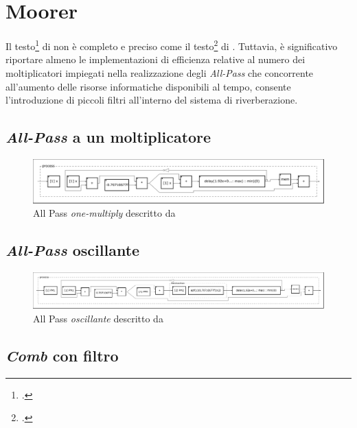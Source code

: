 \section{Moorer}

Il testo\footcite{jm:rev} di \jam non è completo e preciso come il
testo\footcite{ms:rev62} di \ms. Tuttavia, è significativo riportare almeno
le implementazioni di efficienza relative al numero dei moltiplicatori impiegati
nella realizzazione degli \emph{All-Pass} che concorrente all'aumento delle
risorse informatiche disponibili al tempo, consente l'introduzione di piccoli
filtri all'interno del sistema di riverberazione.

\subsection{\emph{All-Pass} a un moltiplicatore}



\begin{figure}[htp]
\centering
\includegraphics[width=1\textwidth]{Code/amapf-svg/process.pdf}
\caption{All Pass \emph{one-multiply} descritto da \jam}
\label{fig:amapf}
\end{figure}

\subsection{\emph{All-Pass} oscillante}



\begin{figure}[htp]
\centering
\includegraphics[width=1\textwidth]{Code/amapfo-svg/process.pdf}
\caption{All Pass \emph{oscillante} descritto da \jam}
\label{fig:amapfo}
\end{figure}

\subsection{\emph{Comb} con filtro}

